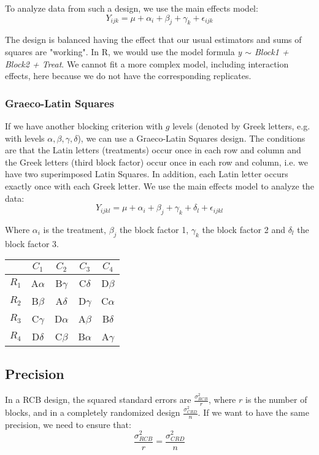 To analyze data from such a design, we use the main effects model:
$$Y_{ijk} = \mu + \alpha_i + \beta_j + \gamma_k + \epsilon_{ijk}$$

The design is balanced having the effect that our usual estimators and sums of squares are "working". In R, we would use the model formula \textit{y $\sim$ Block1 + Block2 + Treat}. We cannot fit a more complex model, including interaction effects, here because we do not have the corresponding replicates.

\subsubsection{Graeco-Latin Squares}

If we have another blocking criterion with $g$ levels (denoted by Greek letters, e.g. with levels $\alpha, \beta, \gamma, \delta$), we can use a Graeco-Latin Squares design. The conditions are that the Latin letters (treatments) occur once in each row and column and the Greek letters (third block factor) occur once in each row and column, i.e. we have two superimposed Latin Squares. In addition, each Latin letter occurs exactly once with each Greek letter. We use the main effects model to analyze the data:
$$Y_{ijkl} = \mu + \alpha_i + \beta_j + \gamma_k + \delta_l + \epsilon_{ijkl}$$

Where $\alpha_i$ is the treatment, $\beta_j$ the block factor 1, $\gamma_k$ the block factor 2 and $\delta_l$ the block factor 3. 

\begin{center}
	\begin{tabular}{c c c c c}
		 & $C_1$ & $C_2$ & $C_3$ & $C_4$\\ \hline
		 $R_1$ & A$\alpha$ & B$\gamma$ & C$\delta$ & D$\beta$ \\ \hline
		 $R_2$ & B$\beta$ & A$\delta$ & D$\gamma$ & C$\alpha$ \\ \hline
		 $R_3$ & C$\gamma$ & D$\alpha$ & A$\beta$ & B$\delta$ \\ \hline
		 $R_4$ & D$\delta$ & C$\beta$ & B$\alpha$ & A$\gamma$ \\ \hline
	\end{tabular}
\end{center}


\subsection{Precision}

In a RCB design, the squared standard errors are $\frac{\sigma_{RCB}^2}{r}$, where $r$ is the number of blocks, and in a completely randomized design $\frac{\sigma_{CRD}^2}{n}$. If we want to have the same precision, we need to ensure that:
$$\frac{\sigma_{RCB}^2}{r} = \frac{\sigma_{CRD}^2}{n}$$

